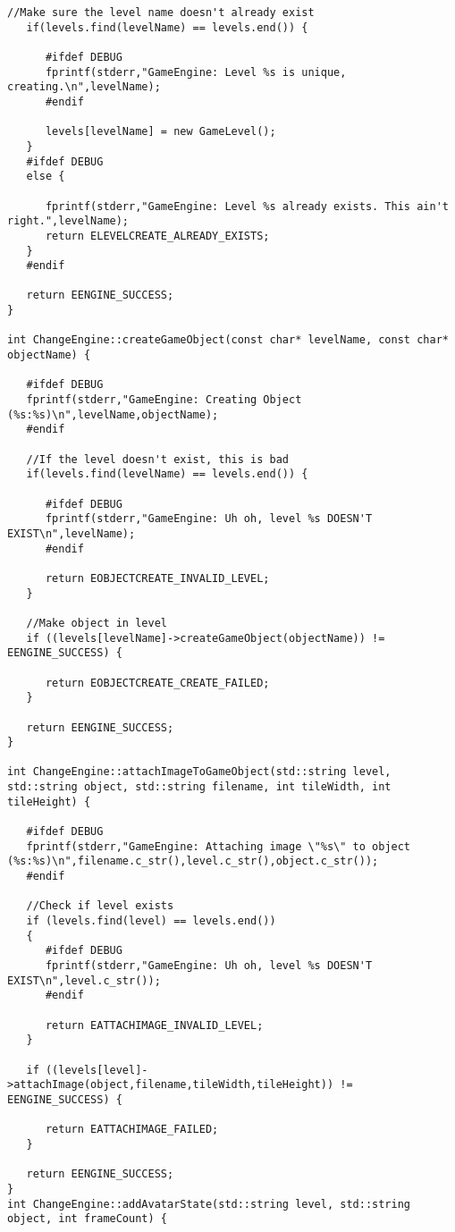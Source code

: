\documentclass[12pt]{article}
\begin{document}
\begin{lstlisting}[breaklines]
   //Make sure the level name doesn't already exist
   if(levels.find(levelName) == levels.end()) {
      
      #ifdef DEBUG
      fprintf(stderr,"GameEngine: Level %s is unique, creating.\n",levelName);
      #endif
      
      levels[levelName] = new GameLevel();
   }
   #ifdef DEBUG
   else {
      
      fprintf(stderr,"GameEngine: Level %s already exists. This ain't right.",levelName);
      return ELEVELCREATE_ALREADY_EXISTS;
   }
   #endif
   
   return EENGINE_SUCCESS;
}

int ChangeEngine::createGameObject(const char* levelName, const char* objectName) {
   
   #ifdef DEBUG
   fprintf(stderr,"GameEngine: Creating Object (%s:%s)\n",levelName,objectName);
   #endif
   
   //If the level doesn't exist, this is bad
   if(levels.find(levelName) == levels.end()) {
      
      #ifdef DEBUG
      fprintf(stderr,"GameEngine: Uh oh, level %s DOESN'T EXIST\n",levelName);
      #endif
      
      return EOBJECTCREATE_INVALID_LEVEL;
   }
            
   //Make object in level
   if ((levels[levelName]->createGameObject(objectName)) != EENGINE_SUCCESS) {
      
      return EOBJECTCREATE_CREATE_FAILED;
   }
   
   return EENGINE_SUCCESS;
}

int ChangeEngine::attachImageToGameObject(std::string level, std::string object, std::string filename, int tileWidth, int tileHeight) {

   #ifdef DEBUG
   fprintf(stderr,"GameEngine: Attaching image \"%s\" to object (%s:%s)\n",filename.c_str(),level.c_str(),object.c_str());
   #endif
   
   //Check if level exists
   if (levels.find(level) == levels.end())
   {
      #ifdef DEBUG
      fprintf(stderr,"GameEngine: Uh oh, level %s DOESN'T EXIST\n",level.c_str());
      #endif
      
      return EATTACHIMAGE_INVALID_LEVEL;
   }
   
   if ((levels[level]->attachImage(object,filename,tileWidth,tileHeight)) != EENGINE_SUCCESS) {
      
      return EATTACHIMAGE_FAILED;
   }

   return EENGINE_SUCCESS;
}
int ChangeEngine::addAvatarState(std::string level, std::string object, int frameCount) {
   

\end{lstlisting}
\end{document}

